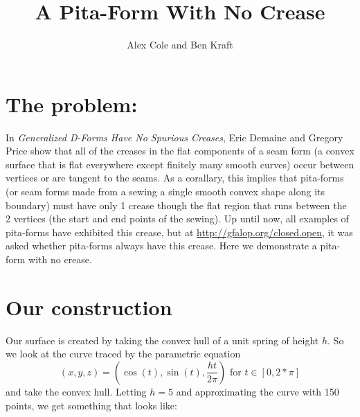 \documentclass[12pt]{article}
\title{A Pita-Form With No Crease}
\author{Alex Cole and Ben Kraft}
\begin{document}
\maketitle

\section{The problem:}
In \textit{Generalized D-Forms Have No Spurious Creases}, Eric Demaine and Gregory Price show that all of the creases in the flat components of a seam form (a convex surface that is flat everywhere except finitely many smooth curves) occur between vertices or are tangent to the seams. As a corallary, this implies that pita-forms (or seam forms made from a sewing a single smooth convex shape along its boundary) must have only 1 crease though the flat region that runs between the 2 vertices (the start and end points of the sewing). Up until now, all examples of pita-forms have exhibited this crease, but at \url{http://gfalop.org/closed.open}, it was asked whether pita-forms always have this crease. Here we demonstrate a pita-form with no crease.

\section{Our construction}
Our surface is created by taking the convex hull of a unit spring of height $h$. So we look at the curve traced by the parametric equation 
$$(x, y, z) = \left(\cos(t), \sin(t), \frac{ht}{2\pi} \right) \text{ for } t \in [0, 2*\pi]$$
and take the convex hull. Letting $h=5$ and approximating the curve with 150 points, we get something that looks like:
\end{document}
